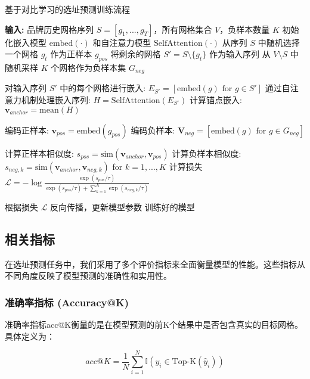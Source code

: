 \documentclass{article}
\begin{document}
\begin{algorithm}[H]
\caption{基于对比学习的选址预测训练流程}
\begin{algorithmic}[1]
\State \textbf{输入:} 品牌历史网格序列 $S = [g_1, ..., g_T]$，所有网格集合 $V$，负样本数量 $K$
\State 初始化嵌入模型 $\text{embed}(\cdot)$ 和自注意力模型 $\text{SelfAttention}(\cdot)$
    \State 从序列 $S$ 中随机选择一个网格 $g_t$ 作为正样本 $g_{pos}$
    \State 将剩余的网格 $S' = S \setminus \{g_t\}$ 作为输入序列
    \State 从 $V \setminus S$ 中随机采样 $K$ 个网格作为负样本集 $G_{neg}$
    
    \State {}
    \State 对输入序列 $S'$ 中的每个网格进行嵌入: $E_{S'} = [\text{embed}(g) \text{ for } g \in S']$
    \State 通过自注意力机制处理嵌入序列: $H = \text{SelfAttention}(E_{S'})$
    \State 计算锚点嵌入: $\mathbf{v}_{anchor} = \text{mean}(H)$
    
    \State {}
    \State 编码正样本: $\mathbf{v}_{pos} = \text{embed}(g_{pos})$
    \State 编码负样本: $\mathbf{V}_{neg} = [\text{embed}(g) \text{ for } g \in G_{neg}]$
    
    \State {}
    \State 计算正样本相似度: $s_{pos} = \text{sim}(\mathbf{v}_{anchor}, \mathbf{v}_{pos})$
    \State 计算负样本相似度: $s_{neg,k} = \text{sim}(\mathbf{v}_{anchor}, \mathbf{v}_{neg,k})$ for $k=1, ..., K$
    \State 计算损失 $\mathcal{L} = -\log \frac{\exp(s_{pos} / \tau)}{\exp(s_{pos} / \tau) + \sum_{k=1}^{K} \exp(s_{neg,k} / \tau)}$
    
    \State {}
    \State 根据损失 $\mathcal{L}$ 反向传播，更新模型参数
\EndFor
\State \Return 训练好的模型
\end{algorithmic}
\end{algorithm}
\subsection{相关指标}
在选址预测任务中，我们采用了多个评价指标来全面衡量模型的性能。这些指标从不同角度反映了模型预测的准确性和实用性。

\subsubsection{准确率指标 (Accuracy@K)}

准确率指标acc@K衡量的是在模型预测的前K个结果中是否包含真实的目标网格。具体定义为：

\begin{equation}
acc@K = \frac{1}{N} \sum_{i=1}^{N} \mathbb{I}(y_i \in \text{Top-K}(\hat{y}_i))
\end{equation}
\end{document}
